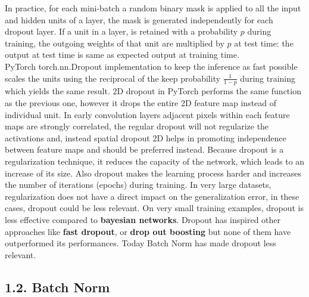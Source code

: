 \documentclass[11pt]{article}
\newcommand{\0}{\mat{0}}
\begin{document}
\begin{itemize}
In practice, for each mini-batch a random binary mask is applied to all the input and hidden units of a layer, the mask is generated independently for each dropout layer. If a unit in a layer, is retained with a probability $p$ during training, the outgoing weights of that unit are multiplied by $p$ at test time: the output at test time is same as expected output at training time.\\ PyTorch torch.nn.Dropout implementation to keep the inference as fast possible scales the units using the reciprocal of the keep probability $\frac{1}{1-p}$ during training which yields the same result. 2D dropout in PyTorch performs the same function as the previous one, however it drops the entire 2D feature map instead of individual unit. In early convolution layers adjacent pixels within each feature maps are strongly correlated, the regular dropout will not regularize the activations and, instead spatial dropout 2D helps in promoting independence between feature maps and should be preferred instead. Because dropout is a regularization technique, it reduces the capacity of the network, which leads to an increase of its size. Also dropout makes the learning process harder and increases the number of iterations (epochs) during training.  In very large datasets, regularization does not have a direct impact on the generalization error, in these cases, dropout could be less relevant. On very small training examples, dropout is less effective compared to \textbf{bayesian networks}. Dropout has inspired other approaches like \textbf{fast dropout}, or \textbf{drop out boosting} but none of them have outperformed its performances. Today Batch Norm has made dropout less relevant.
 

\end{itemize}
\subsection*{1.2. Batch Norm}
\end{document}

